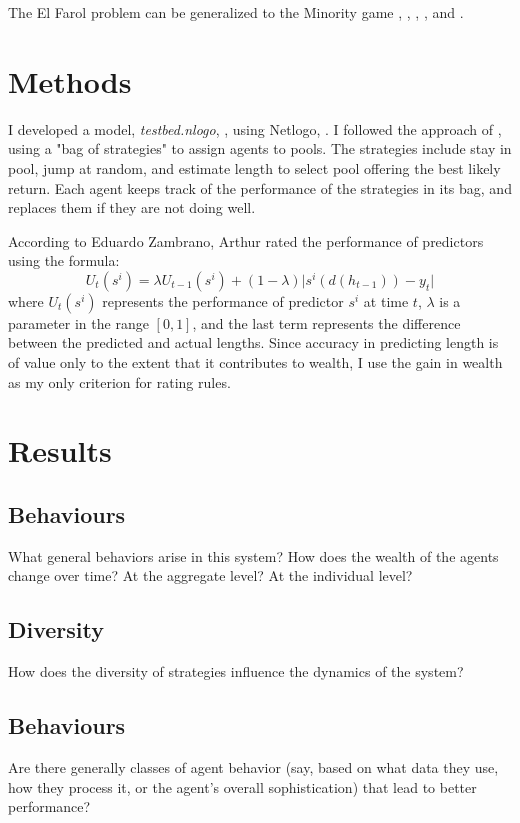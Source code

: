 \documentclass[]{article}
\begin{document}
The El Farol problem can be generalized to the Minority game \cite{challet1997emergence}, \cite{challet1998minority}, \cite{szabo2007evolutionary}, \cite{chakrabarti2007kolkata}, and \cite{chakrabarti2009kolkata}.

\section{Methods}
I developed a model, \emph{testbed.nlogo}, \cite{Github:2018}, using Netlogo, \cite{Wilensky:1999}. I followed the approach of \cite{arthur1994inductive}, using a "bag of strategies" to assign agents to pools. The strategies include stay in pool, jump at random, and estimate length to select pool offering the best likely return. Each agent keeps track of the performance of the strategies in its bag, and replaces them if they are not doing well.

According to Eduardo Zambrano\cite{zambrano2001boundedly}, Arthur rated the performance of predictors using the formula:
\begin{equation}
U_{t}(s^i)=\lambda U_{t-1}(s^i)+(1-\lambda)\lvert s^i(d(h_{t-1}))-y_t \rvert \label{eq:arthur}
\end{equation}
where $U_{t}(s^i)$ represents the performance of predictor $s^i$ at time $t$, $\lambda$ is a parameter in the range $[0,1]$, and the last term represents the difference between the predicted and actual lengths. Since accuracy in predicting length is of value only to the extent that it contributes to wealth, I use the gain in wealth as my only criterion for rating rules. 
\section{Results}

\subsection{Behaviours}What general behaviors arise in this system?  How does the wealth of the agents change over time? At the aggregate level? At the individual level?
\subsection{Diversity}How does the diversity of strategies influence the dynamics of the system?
\subsection{Behaviours}Are there generally classes of agent behavior (say, based on what data they use, how they process it, or the agent's overall sophistication) that lead to better performance?
\end{document}

